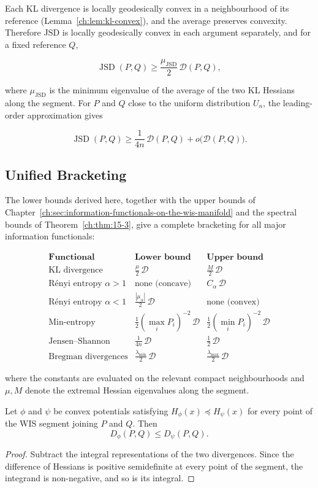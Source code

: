 Each KL divergence is locally geodesically convex in a neighbourhood
of its reference (Lemma~\ref{ch:lem:kl-convex}), and the average preserves
convexity.  Therefore JSD is locally geodesically
convex in each argument separately, and for a fixed reference $Q$,

\[
\operatorname{JSD}(P,Q) \ge \frac{\mu_{\mathrm{JSD}}}{2}\,
\mathcal D(P,Q),
\]

where $\mu_{\mathrm{JSD}}$ is the minimum eigenvalue of the
average of the two KL Hessians along the segment.  For $P$ and $Q$
close to the uniform distribution $U_n$, the leading-order
approximation gives

\[
\operatorname{JSD}(P,Q) \ge \frac{1}{4n}\,\mathcal D(P,Q) + o\bigl(\mathcal D(P,Q)\bigr).
\]

\subsection{Unified Bracketing}\label{ch:sec:unified-bracketing}

The lower bounds derived here, together with the upper bounds of
Chapter~\ref{ch:sec:information-functionals-on-the-wis-manifold} and the spectral bounds of Theorem~\ref{ch:thm:15-3},
give a complete bracketing for all major information functionals:

\[
\begin{array}{lll}
\textbf{Functional} & \textbf{Lower bound} & \textbf{Upper bound} \\ \hline
\text{KL divergence} & \frac{\mu}{2}\,\mathcal D & \frac{M}{2}\,\mathcal D \\
\text{R\'enyi entropy }\alpha>1 & \text{none (concave)} & C_\alpha\,\mathcal D \\
\text{R\'enyi entropy }\alpha<1 & \frac{|\mu_\alpha|}{2}\,\mathcal D & \text{none (convex)} \\
\text{Min-entropy} & \frac12(\max_i P_i)^{-2}\,\mathcal D & \frac12(\min_i P_i)^{-2}\,\mathcal D \\
\text{Jensen--Shannon} & \frac{1}{4n}\,\mathcal D & \frac12\,\mathcal D \\
\text{Bregman divergences} & \frac{\lambda_{\min}}{2}\,\mathcal D & \frac{\lambda_{\max}}{2}\,\mathcal D
\end{array}
\]

where the constants are evaluated on the relevant compact neighbourhoods
and $\mu,M$ denote the extremal Hessian eigenvalues along the segment.

\begin{theorem}\label{ch:thm:15-4}

Let \(\phi\) and \(\psi\) be convex potentials satisfying
$H_\phi(x)\preceq H_\psi(x)$
for every point of the WIS segment joining \(P\) and \(Q\).
Then
\[ \boxed{
D_\phi(P,Q)\le D_\psi(P,Q).
} \]
\end{theorem}
\begin{proof}
Subtract the integral representations of the two divergences. Since the
difference of Hessians is positive semidefinite at every point of the
segment, the integrand is non-negative, and so is its integral.
\end{proof}


